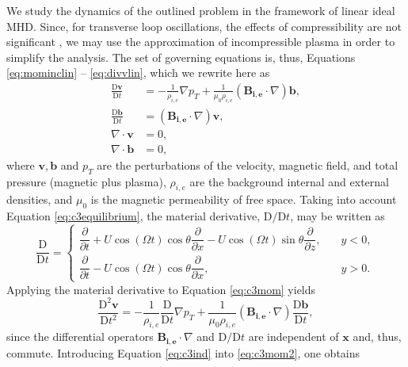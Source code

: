 We study the dynamics of the outlined problem in the framework of linear ideal MHD.
Since, for transverse loop oscillations, the effects of compressibility are not significant \citep{Ruderman2009}, we may use the approximation of incompressible plasma in order to simplify the analysis.
The set of governing equations is, thus, Equations \eqref{eq:mominclin} -- \eqref{eq:divvlin}, which we rewrite here as
% 
\begin{align}
\label{eq:c3mom}
\frac{\mathrm{D} \mathbf{v}}{\mathrm{D} t}
& = - \frac{1}{\rho_{i, e}} \nabla p_T
+ \frac{1}{\mu_0 \rho_{i, e}}( \mathbf{B_{i, e}} \cdot \nabla )\mathbf{b},
\\
\label{eq:c3ind}
\frac{\mathrm{D} \mathbf{b}}{\mathrm{D} t}
& = ( \mathbf{B_{i, e}} \cdot \nabla ) \mathbf{v},
\\
\nabla \cdot \mathbf{v} & = 0,
\\
\nabla \cdot \mathbf{b} & = 0,
\end{align}
%
where $\mathbf v, \mathbf b$ and $p_T$ are the perturbations of the velocity, magnetic field, and total pressure (magnetic plus plasma), $\rho_{i,e}$ are the background internal and external densities, and $\mu_0$ is the magnetic permeability of free space.
Taking into account Equation \eqref{eq:c3equilibrium}, the material derivative, $\mathrm{D}/\mathrm{D} t$, may be written as
%
\begin{equation}
\dfrac{\mathrm{D}}{\mathrm{D} t}
= \begin{cases}
\dfrac{\partial}{\partial t}
+ U \cos(\Omega t) \cos \theta \dfrac{\partial}{\partial x}
- U \cos(\Omega t) \sin \theta \dfrac{\partial}{\partial z}, & \quad y < 0,
\\[0.3cm]
\dfrac{\partial}{\partial t}
- U \cos(\Omega t) \cos \theta \dfrac{\partial}{\partial x}, & \quad y > 0.
\end{cases}
\end{equation}
%
Applying the material derivative to Equation \eqref{eq:c3mom} yields
%
\begin{equation}
\label{eq:c3mom2}
\frac{\mathrm{D}^2 \mathbf{v}}{\mathrm{D} t^2}
= - \frac{1}{\rho_{i, e}} \frac{\mathrm{D}}{\mathrm{D} t} \nabla p_T
+ \frac{1}{\mu_0 \rho_{i, e}}( \mathbf{B_{i, e}} \cdot \nabla) \frac{\mathrm{D} \mathbf{b}}{\mathrm{D} t},
\end{equation}
%
since the differential operators $\mathbf{B_{i, e}} \cdot \nabla$ and $\mathrm{D}/\mathrm{D} t$ are independent of $\mathbf x$ and, thus, commute.
Introducing Equation \eqref{eq:c3ind} into \eqref{eq:c3mom2}, one obtains
